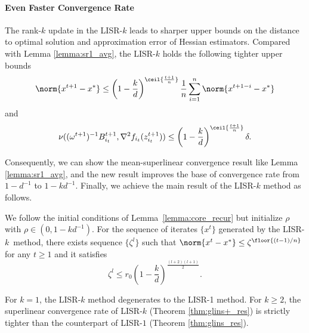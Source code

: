 \paragraph{Even Faster Convergence Rate} 

The rank-$k$ update in the LISR-$k$ leads to sharper upper bounds on the distance to optimal solution and approximation error of Hessian estimators.
Compared with Lemma \ref{lemma:sr1_avg}, the LISR-$k$ holds the following tighter upper bounds
\begin{equation*}
    \norm{x^{t+1} - x^*} \leq \left(1 - \frac{k}{d}\right)^{\ceil{\frac{t+1}{n}}}\frac{1}{n}\sum_{i=1}^n \norm{x^{t+1-i} - x^*}
\end{equation*}
and
\begin{equation*}
    \nu((\omega^{t+1})^{-1} B_{i_t}^{t+1}, \nabla^2 f_{i_t}(z_{i_t}^{t+1})) \leq \left(1 - \frac{k}{d} \right)^{\ceil{\frac{t+1}{n}}} \delta.
\end{equation*}

Consequently, we can show the mean-superlinear convergence result like Lemma \ref{lemma:sr1_avg}, and the new result improves the base of convergence rate from $1-d^{-1}$ to $1-kd^{-1}$. 
Finally, we achieve the main result of the LISR-$k$ method as follows.
\begin{theorem}
    We follow the initial conditions of Lemma~\ref{lemma:core_recur} but initialize $\rho$ with $\rho\in(0,1-kd^{-1})$. For the sequence of iterates $\{x^t\}$ generated by the LISR-$k$~method, there exists sequence $\{\zeta^l\}$ such that $\norm{x^t-x^*} \leq \zeta^{\floor{(t-1)/n}}$ for any $t\geq 1$ and it satisfies
    \begin{equation}
        \zeta^l \leq r_0 \left(1 - \frac{k}{d}\right)^{\frac{(l+2)(l+1)}{2}}.
        \label{srk_result_eq}
    \end{equation}
    \label{thm:glins+_res}
\end{theorem}
\begin{remark}
For $k = 1$, the LISR-$k$ method degenerates to the LISR-1 method.
For $k\geq 2$, the superlinear convergence rate of LISR-$k$ (Theorem \ref{thm:glins+_res}) is strictly tighter than the counterpart of LISR-$1$ (Theorem \ref{thm:glins_res}).
\end{remark}

